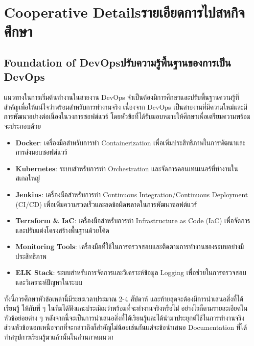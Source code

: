 

\setcounter{secnumdepth}{3}

\chapter{\ifenglish Cooperative Details\else รายเอียดการไปสหกิจศึกษา\fi}


\section{\ifenglish Foundation of DevOps\else ปรับความรู้พื้นฐานของการเป็น DevOps\fi}
แนวทางในการเริ่มต้นทำงานในสายงาน DevOps จำเป็นต้องมีการศึกษาและปรับพื้นฐานความรู้ที่สำคัญเพื่อให้แน่ใจว่าพร้อมสำหรับการทำงานจริง
เนื่องจาก DevOps เป็นสายงานที่มีความใหม่และมีการพัฒนาอย่างต่อเนื่องในวงการซอฟต์แวร์ โดยหัวข้อที่ได้รับมอบหมายให้ศึกษาเพื่อเตรียมความพร้อมจะประกอบด้วย

\begin{itemize}
      \item \textbf{Docker}: เครื่องมือสำหรับการทำ Containerization เพื่อเพิ่มประสิทธิภาพในการพัฒนาและการส่งมอบซอฟต์แวร์
      \item \textbf{Kubernetes}: ระบบสำหรับการทำ Orchestration และจัดการคอนเทนเนอร์ที่ทำงานในสเกลใหญ่
      \item \textbf{Jenkins}: เครื่องมือสำหรับการทำ Continuous Integration/Continuous Deployment (CI/CD) เพื่อเพิ่มความรวดเร็วและลดข้อผิดพลาดในการพัฒนาซอฟต์แวร์
      \item \textbf{Terraform \& IaC}: เครื่องมือสำหรับการทำ Infrastructure as Code (IaC) เพื่อจัดการและปรับแต่งโครงสร้างพื้นฐานด้วยโค้ด
      \item \textbf{Monitoring Tools}: เครื่องมือที่ใช้ในการตรวจสอบและติดตามการทำงานของระบบอย่างมีประสิทธิภาพ
      \item \textbf{ELK Stack}: ระบบสำหรับการจัดการและวิเคราะห์ข้อมูล Logging เพื่อช่วยในการตรวจสอบและวิเคราะห์ปัญหาในระบบ
\end{itemize}

ทั้งนี้การศึกษาหัวข้อเหล่านี้มีระยะเวลาประมาณ 2-4 สัปดาห์ และท้ายสุดจะต้องมีการนำเสนอสิ่งที่ได้เรียนรู้
ให้กับพี่ ๆ ในทีมได้ฟังและประเมิณว่าพร้อมที่จะทำงานจริงหรือไม่ อย่างไรก็ตามรายละเอียดในหัวข้อย่อยต่าง ๆ หลังจากนี้จะเป็นการนำเสนอสิ่งที่ได้เรียนรู้และได้นำมาประยุกต์ใช้ในการทำงานจริง
ส่วนหัวข้อนอกเหนือจากที่จะกล่าวถึงก็สำคัญไม่น้อยเช่นกันแต่จะข้อนำเสนอ Documentation ที่ได้ทำสรุปการเรียนรู้มาแล้วนั้นในส่วนภาคผนวก

